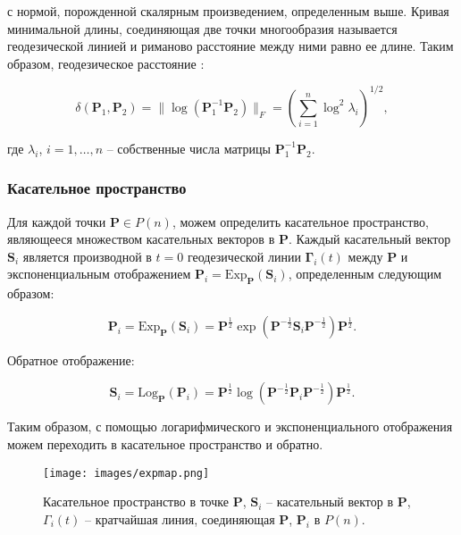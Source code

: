 \documentclass{article}
\begin{document}
с нормой, порожденной скалярным произведением, определенным выше. Кривая минимальной длины, соединяющая две точки многообразия называется геодезической линией и риманово расстояние между ними равно ее длине. Таким образом, геодезическое расстояние \cite{moakher2005differential}:

\begin{equation}
    \delta(\mathbf{P}_1, \mathbf{P}_2) = \|\log (\mathbf{P}_1^{-1}\mathbf{P}_2)\|_F = \left(\sum\limits_{i = 1}^n \log ^2 \lambda_i\right)^{1/2},
\end{equation}

где $\lambda_i$, $i = 1, \ldots, n$ -- собственные числа матрицы $\mathbf{P}_1^{-1}\mathbf{P}_2$. 

\subsubsection{Касательное пространство}

Для каждой точки $\mathbf{P} \in P(n)$, можем определить касательное пространство, являющееся множеством касательных векторов в $\mathbf{P}$. Каждый касательный вектор $\mathbf{S}_i$ является производной в $t = 0$ геодезической линии $\mathbf{\Gamma}_i(t)$ между $\mathbf{P}$ и экспоненциальным отображением $\mathbf{P}_i = \text{Exp}_{\mathbf{P}}(\mathbf{S}_i)$, определенным следующим образом:

\begin{equation}
    \mathbf{P}_i = \text{Exp}_{\mathbf{P}}(\mathbf{S}_i) = \mathbf{P}^{\frac12} \exp( \mathbf{P}^{-\frac12}\mathbf{S}_i\mathbf{P}^{-\frac12})\mathbf{P}^{\frac12}.
\end{equation}

Обратное отображение:

\begin{equation}
    \mathbf{S}_i = \text{Log}_{\mathbf{P}}(\mathbf{P}_i) = \mathbf{P}^{\frac12} \log( \mathbf{P}^{-\frac12}\mathbf{P}_i\mathbf{P}^{-\frac12})\mathbf{P}^{\frac12}.
\end{equation}

Таким образом, с помощью логарифмического и экспоненциального отображения можем переходить в касательное пространство и обратно.

\begin{figure}[h]
    \centering
    \texttt{[image: images/expmap.png]}
  \caption{Касательное пространство в точке $\mathbf{P}$, $\mathbf{S}_i$ -- касательный вектор в $\mathbf{P}$, $\Gamma_i(t)$ -- кратчайшая линия, соединяющая $\mathbf{P}$, $\mathbf{P}_i$ в $P(n)$.}
\end{figure}
\end{document}
